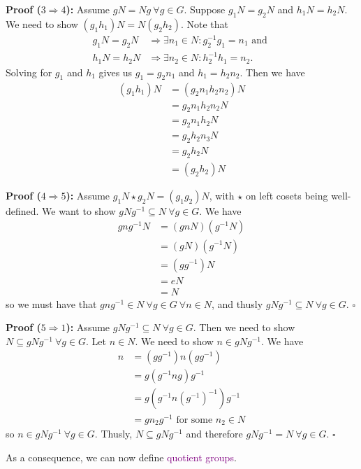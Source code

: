 \documentclass{article}
\begin{document}
\textbf{Proof ($3 \Longrightarrow 4$):} Assume $gN = Ng \ \forall g \in G$. Suppose $g_1N = g_2N$ and $h_1N = h_2N$. We need to show 
$(g_1h_1)N = N(g_2h_2)$. Note that 
\begin{align*}
    g_1N = g_2N &\Longrightarrow \exists n_1 \in N : g_2^{-1}g_1=n_1 \text{ and }\\
    h_1N = h_2N &\Longrightarrow \exists n_2 \in N : h_2^{-1}h_1=n_2.
\end{align*}
Solving for $g_1$ and $h_1$ gives us $g_1 = g_2n_1$ and $h_1=h_2n_2$. Then we have
\begin{align*}
    (g_1h_1)N &= (g_2n_1h_2n_2)N \\
    &= g_2n_1h_2n_2N \\ 
    &= g_2n_1h_2N \\
    &= g_2h_2n_3N \\
    &= g_2h_2N \\
    &=(g_2h_2)N 
\end{align*}

\textbf{Proof ($4 \Longrightarrow 5$):} Assume $g_1N \star g_2N = (g_1g_2)N$, with $\star$ on left cosets being well-defined. We want to 
show $gNg^{-1} \subseteq N \ \forall g \in G$. We have
\begin{align*}
    gng^{-1}N &= (gnN)(g^{-1}N) \\
    &= (gN)(g^{-1}N) \\
    &=(gg^{-1})N \\
    &= eN \\
    &= N
\end{align*}
so we must have that $gng^{-1} \in N \ \forall g \in G \ \forall n \in N$, and thusly $gNg^{-1} \subseteq N \ \forall g \in G$. $\square$

\textbf{Proof ($5 \Longrightarrow 1$):} Assume $gNg^{-1} \subseteq N \ \forall g \in G$. Then we need to show 
$N \subseteq gNg^{-1} \ \forall g \in G$. Let $n \in N$. We need to show $n \in gNg^{-1}$. We have 
\begin{align*}
    n &= (gg^{-1})n(gg^{-1}) \\
    &= g(g^{-1}ng)g^{-1} \\
    &= g(g^{-1}n(g^{-1})^{-1})g^{-1} \\
    &= gn_2g^{-1} \text{ for some } n_2 \in N
\end{align*}
so $n \in gNg^{-1} \ \forall g \in G$. Thusly, $N \subseteq gNg^{-1}$ and therefore $gNg^{-1} = N \ \forall g \in G$. $\square$

As a consequence, we can now define \textcolor{purple}{quotient groups}. 
\end{document}
